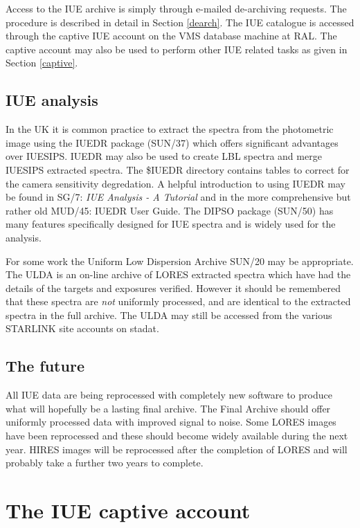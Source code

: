 \documentclass[11pt,twoside]{article}
\newcommand{\xref}[3]{#1}
\newcommand{\xlabel}[1]{}
\begin{document}
Access to the IUE archive is simply through e-mailed de-archiving requests.
The procedure is described in detail in Section \ref{dearch}.
The IUE catalogue is accessed through the captive IUE account on the VMS
database machine at RAL.
The captive account may also be used to perform other 
IUE related tasks as given in Section \ref{captive}.

\subsection {IUE analysis}

In the UK it is common practice to extract the spectra from the photometric
image using the \xref{IUEDR}{sun37}{} package (SUN/37)
which offers significant advantages over IUESIPS.
IUEDR may also be used to create LBL spectra and merge IUESIPS extracted 
spectra.
The \$IUEDR directory contains tables to correct for the camera sensitivity
degredation.
A helpful introduction to using IUEDR may be found in 
\xref{SG/7: {\em IUE Analysis - A
Tutorial}}{sg7}{} and in the more comprehensive but rather old MUD/45: IUEDR User
Guide.
The \xref{DIPSO}{sun50}{} package (SUN/50) has many features specifically designed for IUE
spectra and is widely used for the analysis.

For some work the Uniform Low Dispersion Archive \xref{SUN/20}{sun20}{} may be appropriate.
The ULDA is an on-line archive of LORES extracted spectra which have had the 
details of the targets and exposures verified. 
However it should be remembered that 
these spectra are {\it not} uniformly processed, and are identical to the 
extracted spectra in the full archive.
The ULDA may still be accessed from the various STARLINK site accounts on
stadat.

\subsection {The future}

All IUE data are being reprocessed with completely new software to produce what
will hopefully be a lasting final archive.
The Final Archive should offer uniformly processed data with improved signal to
noise.
Some LORES images have been reprocessed and these should become widely
available during the next year.
HIRES images will be reprocessed after the completion of LORES and will
probably take a further two years to complete.

\section {The IUE captive account
\xlabel{the_iue_captive_account}\label{captive}}
\end{document}
